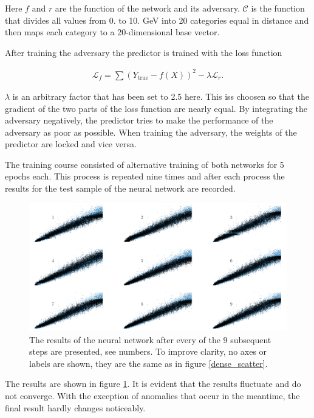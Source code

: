 \documentclass[12pt, a4paper]{thesis}
\begin{document}
Here \(f\) and \(r\) are the function of the network and its
adversary. \(\mathcal{C}\) is the function that divides all values
from 0. to 10. GeV into 20 categories equal in distance and then maps
each category to a 20-dimensional base vector.

After training the adversary the predictor is trained with the loss
function

\begin{align}
\mathcal{L}_f = \sum (Y_{\text{true}} - f(X))^2 - \lambda
\mathcal{L}_r.
\end{align}

\(\lambda\) is an arbitrary factor that has been set to 2.5 here. This
iss choosen so that the gradient of the two parts of the loss function
are nearly equal. By integrating the adversary negatively, the
predictor tries to make the performance of the adversary as poor as
possible. When training the adversary, the weights of the predictor
are locked and vice versa.

The training course consisted of alternative training of both networks
for 5 epochs each. This process is repeated nine times and after each
process the results for the test sample of the neural network are
recorded.

\begin{figure}[hbtp]
\centering
\includegraphics[width=.9\linewidth]{../images/adv_scatter.png}
\caption{ The results of the neural network after every of the 9
  subsequent steps are presented, see numbers. To improve clarity, no
  axes or labels are shown, they are the same as in figure
  \ref{dense_scatter}.}
\label{adv_scatter}
\end{figure}

The results are shown in figure \ref{adv_scatter}.  It is evident that
the results fluctuate and do not converge. With the exception of
anomalies that occur in the meantime, the final result hardly changes
noticeably.
\end{document}
